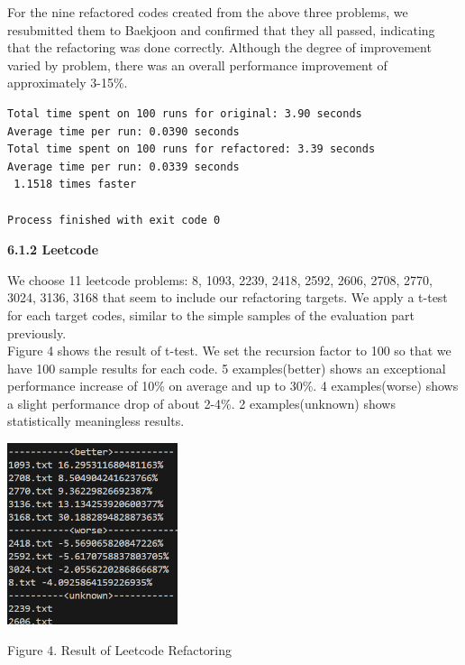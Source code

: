 \documentclass[11pt]{article}
\begin{document}
For the nine refactored codes created from the above three problems, we resubmitted them to Baekjoon and confirmed that they all passed, indicating that the refactoring was done correctly. Although the degree of improvement varied by problem, there was an overall performance improvement of approximately 3-15\%.

\lstset{style=terminal}


\begin{lstlisting}[style=terminal]
Total time spent on 100 runs for original: 3.90 seconds
Average time per run: 0.0390 seconds
Total time spent on 100 runs for refactored: 3.39 seconds
Average time per run: 0.0339 seconds
 1.1518 times faster

Process finished with exit code 0
\end{lstlisting}

\textbf{6.1.2 Leetcode}

We choose 11 leetcode problems: 8, 1093, 2239, 2418, 2592, 2606, 2708, 2770, 3024, 3136, 3168 that seem to include our refactoring targets. We apply a t-test for each target codes, similar to the simple samples of the evaluation part previously.\\
Figure 4 shows the result of t-test. We set the recursion factor to 100 so that we have 100 sample results for each code. 5 examples(better) shows an exceptional performance increase of 10\% on average and up to 30\%. 4 examples(worse) shows a slight performance drop of about 2-4\%. 2 examples(unknown) shows statistically meaningless results.

\begin{center}
\includegraphics[width = 5cm]{images/lc_result.png}

{Figure 4. Result of Leetcode Refactoring}
\end{center}
\end{document}
